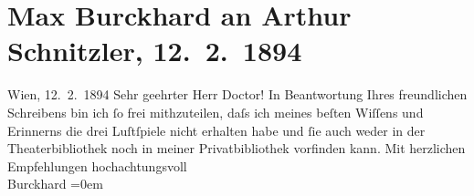 

         
         \renewcommand{\erwaehntePersonen}{Personen: Max Eugen Burckhard}
         \renewcommand{\erwaehnteInstitutionen}{Institutionen: Burgtheater}
         \renewcommand{\erwaehnteOrte}{Orte: Wien}
         \renewcommand{\erwaehnteWerke}{Werke: Anatol}
               \section[Max Burckhard an Arthur Schnitzler, 12. 2. 1894]{ Max Burckhard an Arthur Schnitzler, 12. 2. 1894}\nopagebreak{}\rehead{ }\begin{ledgroupsized}[t]{13cm}\normalsize\beginnumbering \toendnotes[C]{\smallbreak\pagebreak[2]} 
\toendnotes[C]{\smallbreak}\pstart
           \noindent{}{\pb}\textcolor{gray}{\textbf{\label{T_L00298-1v}\label{T_L00298-1h}}}\hfill Wien, 12. 2. 1894\pend
           \pstart{}Sehr geehrter Herr Doctor!\pend\pstart
           In Beantwortung Ihres freundlichen Schreibens bin ich ſo frei mithzuteilen, daſs ich
               meines beſten Wiſſens und Erinnerns die drei Luſtſpiele nicht erhalten habe und ſie auch weder in der
               Theaterbibliothek noch in meiner Privatbibliothek vorfinden kann.\pend
           \pstart
           Mit herzlichen Empfehlungen hochachtungsvoll{\\[\baselineskip]}\spacefill\mbox{Burckhard}\pend
           \leftskip=0em{}
         
         \endnumbering{}\end{ledgroupsized}  \newcommand{\dateiname}{L00298}\newcommand{\titel}{Max Burckhard an Arthur Schnitzler, 12. 2. 1894}\newcommand{\editorInnen}{Martin Anton Müller und Gerd-Hermann Susen}
      